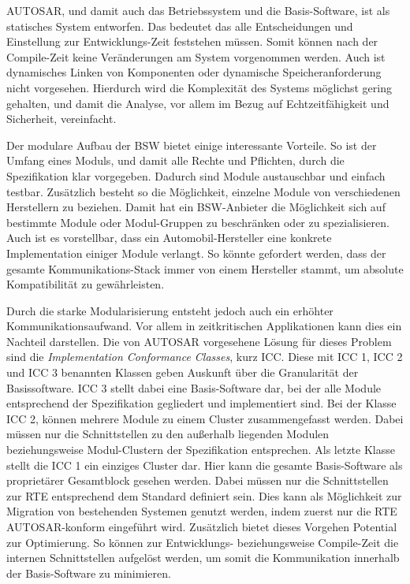 \documentclass[
  a4paper,					    %
  twoside,
  DIV=calc,     				%
  bibliography=totoc,
  cleardoublepage=empty,
  ngerman,     					%
  final       					%
]{scrbook}
\begin{document}
AUTOSAR, und damit auch das Betriebssystem und die Basis-Software, ist als statisches System entworfen. Das bedeutet das alle Entscheidungen und Einstellung zur Entwicklungs-Zeit feststehen müssen. Somit können nach der Compile-Zeit keine Veränderungen am System vorgenommen werden. Auch ist dynamisches Linken von Komponenten oder dynamische Speicheranforderung nicht vorgesehen. Hierdurch wird die Komplexität des Systems möglichst gering gehalten, und damit die Analyse, vor allem im Bezug auf Echtzeitfähigkeit und Sicherheit, vereinfacht.\cite[Seite 186]{SE_Autosar}

Der modulare Aufbau der BSW bietet einige interessante Vorteile. So ist der Umfang eines Moduls, und damit alle Rechte und Pflichten, durch die Spezifikation klar vorgegeben. Dadurch sind Module austauschbar und einfach testbar. Zusätzlich besteht so die Möglichkeit, einzelne Module von verschiedenen Herstellern zu beziehen. Damit hat ein BSW-Anbieter die Möglichkeit sich auf bestimmte Module oder Modul-Gruppen zu beschränken oder zu spezialisieren. Auch ist es vorstellbar, dass ein Automobil-Hersteller eine konkrete Implementation einiger Module verlangt. So könnte gefordert werden, dass der gesamte Kommunikations-Stack immer von einem Hersteller stammt, um absolute Kompatibilität zu gewährleisten.

Durch die starke Modularisierung entsteht jedoch auch ein erhöhter Kommunikationsaufwand. Vor allem in zeitkritischen Applikationen kann dies ein Nachteil darstellen. Die von AUTOSAR vorgesehene Lösung für dieses Problem sind die \emph{Implementation Conformance Classes}, kurz ICC. Diese mit ICC 1, ICC 2 und ICC 3 benannten Klassen geben Auskunft über die Granularität der Basissoftware. ICC 3 stellt dabei eine Basis-Software dar, bei der alle Module entsprechend der Spezifikation gegliedert und implementiert sind. Bei der Klasse ICC 2, können mehrere Module zu einem Cluster zusammengefasst werden. Dabei müssen nur die Schnittstellen zu den außerhalb liegenden Modulen beziehungsweise Modul-Clustern der Spezifikation entsprechen. Als letzte Klasse stellt die ICC 1 ein einziges Cluster dar. Hier kann die gesamte Basis-Software als proprietärer Gesamtblock gesehen werden. Dabei müssen nur die Schnittstellen zur RTE entsprechend dem Standard definiert sein. Dies kann als Möglichkeit zur Migration von bestehenden Systemen genutzt werden, indem zuerst nur die RTE AUTOSAR-konform eingeführt wird. Zusätzlich bietet dieses Vorgehen Potential zur Optimierung. So können zur Entwicklungs- beziehungsweise Compile-Zeit die internen Schnittstellen aufgelöst werden, um somit die Kommunikation innerhalb der Basis-Software zu minimieren.
\end{document}
